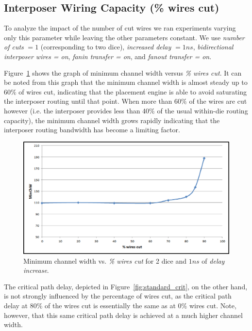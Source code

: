 \documentclass{sig-alternate-2013}
\begin{document}
\subsection{Interposer Wiring Capacity (\% wires cut)}

To analyze the impact of the number of cut wires we ran experiments varying only this parameter while leaving the other parameters constant. We use \textit{number of cuts} $= 1$ (corresponding to two dice), \textit{increased delay} $= 1ns$, \textit{bidirectional interposer wires = on}, \textit{fanin transfer = on}, and \textit{fanout transfer = on}.

Figure~\ref{fig:standard_minW} shows the graph of minimum channel width versus \textit{\% wires cut}. It can be noted from this graph that the minimum channel width is almost steady up to 60\% of wires cut, indicating that the placement engine is able to avoid saturating the interposer routing until that point. When more than 60\% of the wires are cut however (i.e. the interposer provides less than 40\% of the usual within-die routing capacity), the minimum channel width grows rapidly indicating that the interposer routing bandwidth has become a limiting factor.

\begin{figure}[!htbp]
\centering
\includegraphics[width=\linewidth]{minChW.eps}
\caption{Minimum channel width vs. \textit{\% wires cut} for 2 dice and $1ns$ of \textit{delay increase}.}
\label{fig:standard_minW}
\end{figure}

The critical path delay, depicted in Figure~\ref{fig:standard_crit}, on the other hand, is not strongly influenced by the percentage of wires cut, as the critical path delay at 80\% of the wires cut is essentially the same as at 0\% wires cut. Note, however, that this same critical path delay is achieved at a much higher channel width.
\end{document}
